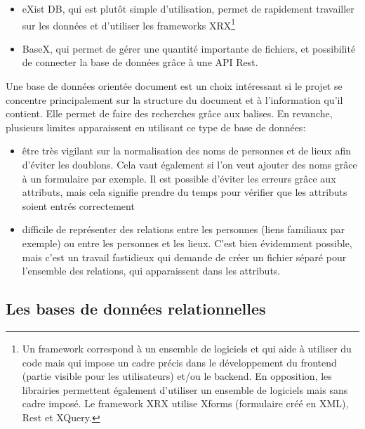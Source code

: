 \begin{itemize}
    \item eXist DB, qui est plutôt simple d’utilisation, permet de rapidement travailler sur les données et d’utiliser les frameworks XRX\footnote{Un framework correspond à un ensemble de logiciels et qui aide à utiliser du code mais qui impose un cadre précis dans le développement du frontend (partie visible pour les utilisateurs) et/ou le backend. En opposition, les librairies permettent également d’utiliser un ensemble de logiciels mais sans cadre imposé. Le framework XRX utilise Xforms (formulaire créé en XML), Rest et XQuery.}
    \item BaseX, qui permet de gérer une quantité importante de fichiers, et possibilité de connecter la base de données grâce à une API Rest.\\
    
\end{itemize}

\noindent Une base de données orientée document est un choix intéressant si le projet se concentre principalement sur la structure du document et à l’information qu’il contient. Elle permet de faire des recherches grâce aux balises. En revanche, plusieurs limites apparaissent en utilisant ce type de base de données:\\ 

\begin{itemize}
    \item être très vigilant sur la normalisation des noms de personnes et de lieux afin d’éviter les doublons. Cela vaut également si l’on veut ajouter des noms grâce à un formulaire par exemple. Il est possible d’éviter les erreurs grâce aux attributs, mais cela signifie prendre du temps pour vérifier que les attributs soient entrés correctement
    \item difficile de représenter des relations entre les personnes (liens familiaux par exemple) ou entre les personnes et les lieux. C’est bien évidemment possible, mais c’est un travail fastidieux qui demande de créer un fichier séparé pour l’ensemble des relations, qui apparaissent dans les attributs.
    
\end{itemize}

    
    \subsection{Les bases de données relationnelles}

